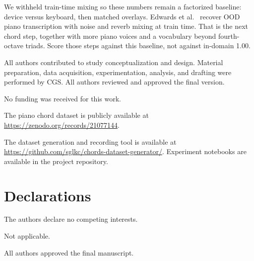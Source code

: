 \documentclass[pdflatex,sn-mathphys-num,iicol]{sn-jnl}
\theoremstyle{thmstyleone}
\theoremstyle{thmstyletwo}
\theoremstyle{thmstylethree}
\begin{document}
We withheld train-time mixing so these numbers remain a factorized baseline: device versus keyboard, then matched overlays. Edwards et al.\ \cite{Edwards2024} recover OOD piano transcription with noise and reverb mixing at train time. That is the next chord step, together with more piano voices and a vocabulary beyond fourth-octave triads. Score those steps against this baseline, not against in-domain 1.00.

\backmatter

All authors contributed to study conceptualization and design. Material preparation, data acquisition, experimentation, analysis, and drafting were performed by CGS. All authors reviewed and approved the final version.

No funding was received for this work.

The piano chord dataset is publicly available at \url{https://zenodo.org/records/21077144}.

The dataset generation and recording tool is available at \url{https://github.com/sglkc/chords-dataset-generator/}. Experiment notebooks are available in the project repository.

\section*{Declarations}

The authors declare no competing interests.

Not applicable.

All authors approved the final manuscript.


\end{document}

